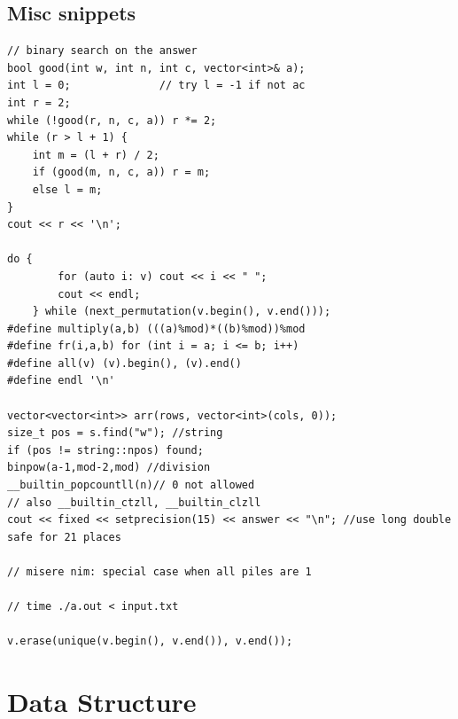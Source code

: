 \subsection{Misc snippets}
\begin{lstlisting}
// binary search on the answer
bool good(int w, int n, int c, vector<int>& a);
int l = 0;              // try l = -1 if not ac
int r = 2;
while (!good(r, n, c, a)) r *= 2;
while (r > l + 1) {
    int m = (l + r) / 2;
    if (good(m, n, c, a)) r = m;
    else l = m;
}
cout << r << '\n';

do {
        for (auto i: v) cout << i << " ";
        cout << endl;
    } while (next_permutation(v.begin(), v.end()));
#define multiply(a,b) (((a)%mod)*((b)%mod))%mod
#define fr(i,a,b) for (int i = a; i <= b; i++)
#define all(v) (v).begin(), (v).end()
#define endl '\n'

vector<vector<int>> arr(rows, vector<int>(cols, 0));
size_t pos = s.find("w"); //string
if (pos != string::npos) found;
binpow(a-1,mod-2,mod) //division
__builtin_popcountll(n)// 0 not allowed
// also __builtin_ctzll, __builtin_clzll
cout << fixed << setprecision(15) << answer << "\n"; //use long double safe for 21 places

// misere nim: special case when all piles are 1

// time ./a.out < input.txt

v.erase(unique(v.begin(), v.end()), v.end());
\end{lstlisting}
\section{Data Structure}
